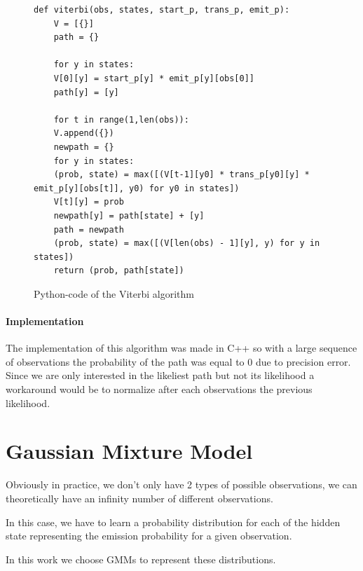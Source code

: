 \documentclass{techrep} %
\begin{document}
\begin{figure}[H]
  \begin{lstlisting}[frame=single]
    def viterbi(obs, states, start_p, trans_p, emit_p):
    V = [{}]
    path = {}

    for y in states:
    V[0][y] = start_p[y] * emit_p[y][obs[0]]
    path[y] = [y]

    for t in range(1,len(obs)):
    V.append({})
    newpath = {}
    for y in states:
    (prob, state) = max([(V[t-1][y0] * trans_p[y0][y] * emit_p[y][obs[t]], y0) for y0 in states])
    V[t][y] = prob
    newpath[y] = path[state] + [y]
    path = newpath
    (prob, state) = max([(V[len(obs) - 1][y], y) for y in states])
    return (prob, path[state])
  \end{lstlisting}
  \caption{Python-code of the Viterbi algorithm}
  \label{viter}
\end{figure}

\paragraph{Implementation} The implementation of this algorithm was made in C++ so
with a large sequence of observations the probability of the path was
equal to 0 due to precision error. Since we are only interested in
the likeliest path but not its likelihood a workaround would be to
normalize after each observations the previous likelihood.

\section{Gaussian Mixture Model}

Obviously in practice, we don't only have 2 types of possible
observations, we can theoretically have an infinity number of
different observations.

In this case, we have to learn a probability distribution for each of
the hidden state representing the emission probability for a given
observation.

In this work we choose GMMs to represent these distributions.
\end{document}
